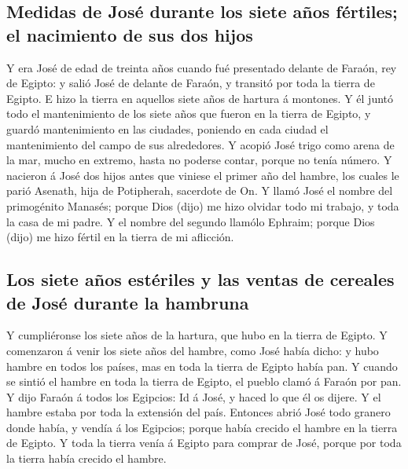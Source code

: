 \hypertarget{medidas-de-josuxe9-durante-los-siete-auxf1os-fuxe9rtiles-el-nacimiento-de-sus-dos-hijos}{%
\subsection{Medidas de José durante los siete años fértiles; el
nacimiento de sus dos
hijos}\label{medidas-de-josuxe9-durante-los-siete-auxf1os-fuxe9rtiles-el-nacimiento-de-sus-dos-hijos}}

 Y era José de edad de treinta años cuando fué presentado
delante de Faraón, rey de Egipto: y salió José de delante de Faraón, y
transitó por toda la tierra de Egipto.  E hizo la tierra
en aquellos siete años de hartura á montones.  Y él juntó
todo el mantenimiento de los siete años que fueron en la tierra de
Egipto, y guardó mantenimiento en las ciudades, poniendo en cada ciudad
el mantenimiento del campo de sus alrededores.  Y acopió
José trigo como arena de la mar, mucho en extremo, hasta no poderse
contar, porque no tenía número.  Y nacieron á José dos
hijos antes que viniese el primer año del hambre, los cuales le parió
Asenath, hija de Potipherah, sacerdote de On.  Y llamó
José el nombre del primogénito Manasés; porque Dios (dijo) me hizo
olvidar todo mi trabajo, y toda la casa de mi padre.  Y
el nombre del segundo llamólo Ephraim; porque Dios (dijo) me hizo fértil
en la tierra de mi aflicción.

\hypertarget{los-siete-auxf1os-estuxe9riles-y-las-ventas-de-cereales-de-josuxe9-durante-la-hambruna}{%
\subsection{Los siete años estériles y las ventas de cereales de José
durante la
hambruna}\label{los-siete-auxf1os-estuxe9riles-y-las-ventas-de-cereales-de-josuxe9-durante-la-hambruna}}

 Y cumpliéronse los siete años de la hartura, que hubo en
la tierra de Egipto.  Y comenzaron á venir los siete años
del hambre, como José había dicho: y hubo hambre en todos los países,
mas en toda la tierra de Egipto había pan.  Y cuando se
sintió el hambre en toda la tierra de Egipto, el pueblo clamó á Faraón
por pan. Y dijo Faraón á todos los Egipcios: Id á José, y haced lo que
él os dijere.  Y el hambre estaba por toda la extensión
del país. Entonces abrió José todo granero donde había, y vendía á los
Egipcios; porque había crecido el hambre en la tierra de Egipto.
 Y toda la tierra venía á Egipto para comprar de José,
porque por toda la tierra había crecido el hambre.

